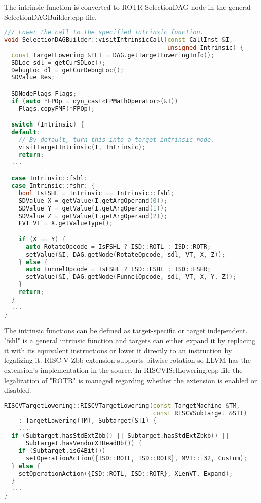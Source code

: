 The intrinsic function is converted to ROTR SelectionDAG node in the general SelectionDAGBuilder.cpp file.
\begin{lstlisting}[language=C++, caption={Funnel Shift Intrinsic converted to ROTL}]
/// Lower the call to the specified intrinsic function.
void SelectionDAGBuilder::visitIntrinsicCall(const CallInst &I,
                                             unsigned Intrinsic) {
  const TargetLowering &TLI = DAG.getTargetLoweringInfo();
  SDLoc sdl = getCurSDLoc();
  DebugLoc dl = getCurDebugLoc();
  SDValue Res;

  SDNodeFlags Flags;
  if (auto *FPOp = dyn_cast<FPMathOperator>(&I))
    Flags.copyFMF(*FPOp);

  switch (Intrinsic) {
  default:
    // By default, turn this into a target intrinsic node.
    visitTargetIntrinsic(I, Intrinsic);
    return;
  ...

  case Intrinsic::fshl:
  case Intrinsic::fshr: {
    bool IsFSHL = Intrinsic == Intrinsic::fshl;
    SDValue X = getValue(I.getArgOperand(0));
    SDValue Y = getValue(I.getArgOperand(1));
    SDValue Z = getValue(I.getArgOperand(2));
    EVT VT = X.getValueType();

    if (X == Y) {
      auto RotateOpcode = IsFSHL ? ISD::ROTL : ISD::ROTR;
      setValue(&I, DAG.getNode(RotateOpcode, sdl, VT, X, Z));
    } else {
      auto FunnelOpcode = IsFSHL ? ISD::FSHL : ISD::FSHR;
      setValue(&I, DAG.getNode(FunnelOpcode, sdl, VT, X, Y, Z));
    }
    return;
  }
  ...
}

\end{lstlisting}


The intrinsic functions can be defined as target-specific or target independent. "fshl" is a general intrinsic function and targets can either expand it by replacing it with its equivalent instructions or lower it directly to an instruction by legalizing it. RISC-V Zbb extension supports bitwise rotation so LLVM has the extension's implementation in the source. In RISCVISelLowering.cpp file the legalization of "ROTR" is managed regarding whether the extension is enabled or disabled.

\begin{lstlisting}[language=C++, caption={ROTR Legalization Conditional}]
RISCVTargetLowering::RISCVTargetLowering(const TargetMachine &TM,
                                         const RISCVSubtarget &STI)
    : TargetLowering(TM), Subtarget(STI) {
    ...
  if (Subtarget.hasStdExtZbb() || Subtarget.hasStdExtZbkb() ||
      Subtarget.hasVendorXTHeadBb()) {
    if (Subtarget.is64Bit())
      setOperationAction({ISD::ROTL, ISD::ROTR}, MVT::i32, Custom);
  } else {
    setOperationAction({ISD::ROTL, ISD::ROTR}, XLenVT, Expand);
  }
  ...
}
\end{lstlisting}

